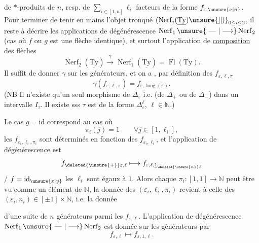
de $*$-produits de $n$, resp. de $\sum_{i\in[1,n]}\ell_i$ facteurs de la forme $f_{\varepsilon,\unsure{\nu|n}}$. Pour terminer de tenir en mains l'objet  tronqué $(\operatorname{Nerf}_i(\underline{\mathrm{Ty}})\unsure{]|)}_{0\leq i\leq2}$, il reste à décrire les  applications de dégénérescence $\operatorname{Nerf}_1\unsure{\text{ --- }|\longrightarrow}\operatorname{Nerf}_2$ (cas où $f$ ou $g$ est une flèche identique), et surtout l'application de \uline{composition} des flèches
\[
\operatorname{Nerf}_2(\underline{\mathrm{Ty}})\xrightarrow{\gamma}\operatorname{Nerf}_1(\underline{\mathrm{Ty}})=\operatorname{Fl}(\mathrm{Ty}).
\]
Il suffit de donner $\gamma$ sur les générateurs, et on a , par définition des $f_{\varepsilon,\ell,\pi}$
\[
\gamma(f_{\varepsilon,\ell,\pi})=f_{\varepsilon,\operatorname{long}(\pi)}.
\]
(NB Il n'existe  qu'un seul morphisme de $\Delta_\varepsilon$ i.e. (de $\Delta_+$ ou de $\Delta_-$) dans un intervalle $I_\tau$. Il existe sss $\tau$ est de la forme $\Delta_\varepsilon^\ell$, $\ell\in\mathbb N$.)

Le cas $g=\mathrm{id}$ correspond au cas où
\[
\pi_i(j)=1\qquad\forall j\in[1,\ell_i],
\]
les $f_{\varepsilon_i,\ell_i,\pi_i}$ sont  déterminés en fonction des $f_{\varepsilon_i,\ell_i}$, et l'application de dégénérescence est
\[
 f_{\deleted{\unsure{+}}\varepsilon,\ell}\longmapsto f_{\varepsilon,\ell,\underline{1}_{\deleted{\unsure{n}}\ell}}
\]
  / $f=\mathrm{id}_{\unsure{x|y}}$  les $\ell_i$ sont égaux à $1$. Alors   chaque $\pi_i:[1,1]\to\mathbb N$ peut être vu comme un  élément de $\mathbb N$, la donnée des $(\varepsilon_i,\ell_i,\pi_i)$ revient à celle des $(\varepsilon_i,n_i)\in[\pm1]\times\mathbb N$, i.e. la donnée 


d'une suite de $n$ générateurs parmi les $f_{\varepsilon,\ell}$. L'application de dégénérescence $\operatorname{Nerf}_1\unsure{\text{ --- }|\longrightarrow}\operatorname{Nerf}_2$ est  donnée sur les générateurs par
\[
f_{\varepsilon,\ell}\longmapsto f_{\varepsilon,1,\ell}.
\]

